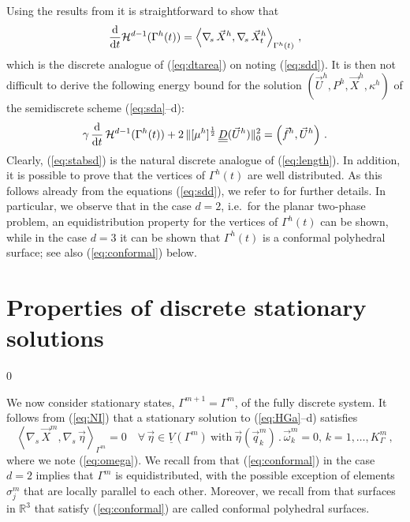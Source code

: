 \documentclass[a4paper,12pt,onecolumn]{article}
\newcommand{\R}{{\mathbb R}}
\newcommand{\Vh}{\underline{V}(\Gamma^m)}
\newcommand{\nabs}{\nabla_{\!s}}
\newcommand{\ddt}{\frac{\rm d}{{\rm d}t}}
\newcommand{\mat}[1]{\underline{\underline{#1}}\rule{0pt}{0pt}}
\begin{document}
Using the results from \cite{gflows3d} it is straightforward to show that
\begin{equation*}
\ddt \mathcal{H}^{d-1}(\Gamma^h(t)) = \left\langle \nabs\,\vec{X}^h,
\nabs\,\vec{X}^h_t \right\rangle_{\Gamma^h(t)} \,,
\end{equation*}
which is the discrete analogue of  (\ref{eq:dtarea}) on noting (\ref{eq:sdd}).
It is then not difficult to derive the following energy bound for the solution
$(\vec U^h, P^h, \vec{X}^h, \kappa^h)$ of the semidiscrete scheme
(\ref{eq:sda}--d):
\begin{equation}\label{eq:stabsd}
\gamma\,\ddt\,\mathcal{H}^{d-1}(\Gamma^h(t)) + 2\,\|[\mu^h]^\frac12\,\mat
D(\vec U^h)\|^2_{0} = \left(\vec f^h, \vec U^h\right) \,.
\end{equation}
Clearly, (\ref{eq:stabsd}) is the natural discrete analogue of
(\ref{eq:length}). In addition, it is possible to prove that the vertices of
$\Gamma^h(t)$ are well distributed. As this follows already from the equations
(\ref{eq:sdd}), we refer to \cite{triplej,gflows3d} for further details. In
particular, we observe that in the case $d=2$, i.e.\ for the planar two-phase
problem, an equidistribution property for the vertices of $\Gamma^h(t)$ can be
shown, while in the case $d=3$ it can be shown that $\Gamma^h(t)$ is a
conformal polyhedral surface; see also (\ref{eq:conformal}) below.

\section{Properties of discrete stationary solutions}
\label{sec:discrete_solution_properties}
\setcounter{equation} 0

We now consider stationary states, $\Gamma^{m+1} = \Gamma^m$, of the fully
discrete system. It follows from (\ref{eq:NI}) that a stationary solution to
(\ref{eq:HGa}--d) satisfies
\begin{equation}\label{eq:conformal}
\left\langle \nabs\, \vec X^m,\nabs\,\vec\eta\right\rangle_{\Gamma^m}=0 \quad
\forall \,\vec\eta\in \Vh \ \text{with}\
\vec\eta(\vec{q}_k^m)\,.\,\vec\omega_k^{m} = 0,\, k = 1 ,\ldots, K^m_\Gamma \,,
\end{equation}
where we note (\ref{eq:omega}). We recall from \cite{triplej} that
(\ref{eq:conformal}) in the case $d=2$ implies that $\Gamma^m$ is
equidistributed, with the possible exception of elements $\sigma^m_j$ that are
locally parallel to each other. Moreover, we recall from \cite{gflows3d} that
surfaces in $\R^3$ that satisfy (\ref{eq:conformal}) are called conformal
polyhedral surfaces.
\end{document}
